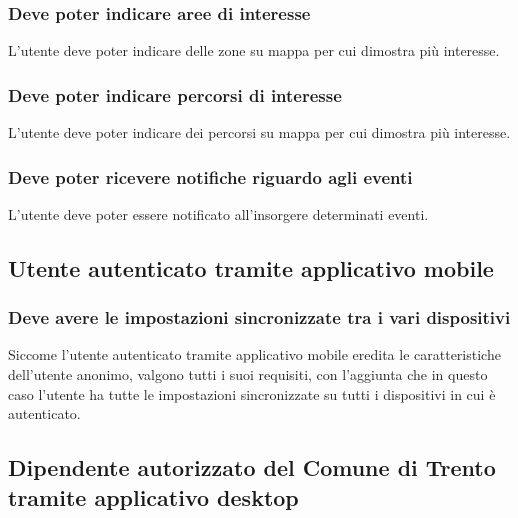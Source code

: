 \documentclass{article}
\begin{document}
\subsubsection{Deve poter indicare aree di interesse}
L'utente deve poter indicare delle zone su mappa per cui dimostra più interesse.

\subsubsection{Deve poter indicare percorsi di interesse}
L'utente deve poter indicare dei percorsi su mappa per cui dimostra più interesse.

\subsubsection{Deve poter ricevere notifiche riguardo agli eventi}
L'utente deve poter essere notificato all'insorgere determinati eventi.

\subsection{Utente autenticato tramite applicativo mobile}

\subsubsection{Deve avere le impostazioni sincronizzate tra i vari dispositivi}
Siccome l'utente autenticato tramite applicativo mobile eredita le caratteristiche dell'utente anonimo, valgono tutti i suoi requisiti, con l'aggiunta che in questo caso l'utente ha tutte le impostazioni sincronizzate su tutti i dispositivi in cui è autenticato.

\subsection{Dipendente autorizzato del Comune di Trento tramite applicativo desktop}
\end{document}
